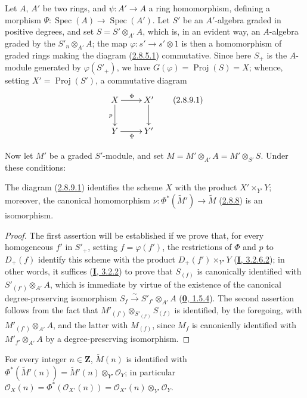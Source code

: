 \begin{env}[2.8.9]
\label{II.2.8.9}
Let $A$, $A'$ be two rings, and $\psi:A'\to A$ a ring homomorphism, defining
a morphism
$\Psi:\operatorname{Spec}(A)\to\operatorname{Spec}(A')$. Let $S'$ be an
$A'$-algebra graded in positive degrees, and set $S=S'\otimes_{A'}A$, which
is, in an evident way, an $A$-algebra graded by the $S'_n\otimes_{A'}A$;
the map $\varphi:s'\to s'\otimes1$ is then a homomorphism of graded rings
making the diagram (\hyperref[II.2.8.5.1]{2.8.5.1}) commutative. Since here
$S_+$ is the $A$-module generated by $\varphi(S'_+)$, we have
$G(\varphi)=\operatorname{Proj}(S)=X$; whence, setting
$X'=\operatorname{Proj}(S')$, a commutative diagram
\[
\label{II.2.8.9.1}
  \xymatrix{
    X\ar[r]^{\Phi}\ar[d]_p & X'\ar[d]\\
    Y\ar[r]_{\Psi} & Y'
  }
\tag{2.8.9.1}
\]

Now let $M'$ be a graded $S'$-module, and set
$M=M'\otimes_{A'}A=M'\otimes_{S'}S$. Under these conditions:
\end{env}

\begin{proposition}[2.8.10]
\label{II.2.8.10}
The diagram \textup{(\hyperref[II.2.8.9.1]{2.8.9.1})} identifies the scheme $X$ with
the product $X'\times_{Y'}Y$; moreover, the canonical homomorphism
$\nu:\Phi^*(\widetilde{M}')\to\widetilde{M}$
\textup{(\hyperref[II.2.8.8]{2.8.8})} is an isomorphism.
\end{proposition}

\begin{proof}
The first assertion will be established if we prove that, for every
homogeneous $f'$ in $S'_+$, setting $f=\varphi(f')$, the restrictions of
$\Phi$ and $p$ to $D_+(f)$ identify this scheme with the product
$D_+(f')\times_{Y'}Y$ (\hyperref[I.3.2.6.2]{\textbf{I}, 3.2.6.2}); in other words,
it suffices (\hyperref[I.3.2.2]{\textbf{I}, 3.2.2}) to prove that $S_{(f)}$ is
canonically identified with $S'_{(f')}\otimes_{A'}A$, which is immediate by
virtue of the existence of the canonical degree-preserving isomorphism
$S_f\xrightarrow{\sim}S'_{f'}\otimes_{A'}A$
(\hyperref[0.1.5.4]{\textbf{0}, 1.5.4}). The second assertion follows from the fact
that $M'_{(f')}\otimes_{S'_{(f')}}S_{(f)}$ is identified, by the foregoing,
with $M'_{(f')}\otimes_{A'}A$, and the latter with $M_{(f)}$, since $M_f$ is
canonically identified with $M'_{f'}\otimes_{A'}A$ by a degree-preserving
isomorphism.
\end{proof}

\begin{corollary}[2.8.11]
\label{II.2.8.11}
For every integer $n\in\mathbf{Z}$, $\widetilde{M}(n)$ is identified with
$\Phi^*(\widetilde{M}'(n))=\widetilde{M}'(n)\otimes_{Y'}\mathcal{O}_Y$;
in particular
$\mathcal{O}_X(n)=\Phi^*(\mathcal{O}_{X'}(n))
=\mathcal{O}_{X'}(n)\otimes_{Y'}\mathcal{O}_Y$.
\end{corollary}

